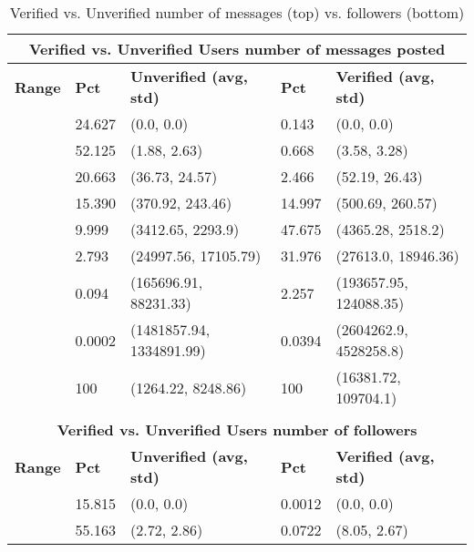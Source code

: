\begin{table}
\renewcommand{\arraystretch}{0.99}
\small
\caption[Verified vs. Unverified Comparison using Messages and Followers]{Verified vs. Unverified number of messages (top) vs. followers (bottom)}
\label{table_12_app2}
\begin{center}
\begin{tabular}{|l|l|l|l|l|}
\multicolumn{5}{c}{\bfseries Verified vs. Unverified Users number of messages posted}\\
\hline
\bfseries Range & \bfseries Pct & \bfseries Unverified (avg, std) & \bfseries Pct & \bfseries Verified (avg, std)\\
\hline
[0,0] & 24.627 & (0.0, 0.0) & 0.143 & (0.0, 0.0) \\
\hline
[0,10] & 52.125 & (1.88, 2.63) & 0.668 & (3.58, 3.28) \\
\hline
[10,100] & 20.663 & (36.73, 24.57) & 2.466 & (52.19, 26.43) \\
\hline
[100,1000] & 15.390 & (370.92, 243.46) & 14.997 & (500.69, 260.57) \\
\hline
[1000,10000] & 9.999 & (3412.65, 2293.9) & 47.675 & (4365.28, 2518.2) \\
\hline
[10000,100000] & 2.793 & (24997.56, 17105.79) & 31.976 & (27613.0, 18946.36) \\
\hline
[100000,1000000] & 0.094 & (165696.91, 88231.33) & 2.257 & (193657.95, 124088.35) \\
\hline
[1000000,Inf] & 0.0002 & (1481857.94, 1334891.99) & 0.0394 & (2604262.9, 4528258.8) \\
\hline
[0, Inf] & 100 & (1264.22, 8248.86) & 100 & (16381.72, 109704.1) \\
\hline
\multicolumn{5}{c}{}\\
\multicolumn{5}{c}{\bfseries Verified vs. Unverified Users number of followers}\\
\hline
\bfseries Range & \bfseries Pct & \bfseries Unverified (avg, std) & \bfseries Pct & \bfseries Verified (avg, std)\\
\hline
[0,0] & 15.815 & (0.0, 0.0) & 0.0012 & (0.0, 0.0)\\
\hline
[0,10] & 55.163 & (2.72, 2.86) & 0.0722 & (8.05, 2.67)\\

\end{tabular}
\end{center}
\end{table}
